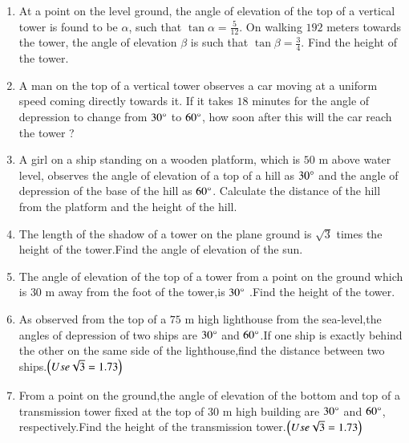 \begin{enumerate}[label=\thesubsection.\arabic*.,ref=\thesubsection.\theenumi]
    \hfill{}\item At a point on the level ground, the angle of elevation of the top of a vertical tower is found to be $\alpha$, such that $\tan\alpha = \frac{5}{12}$. On walking $192$ meters towards the tower, the angle of elevation $\beta$ is such that $\tan\beta = \frac{3}{4}$. Find the height of the tower.
    
    \hfill{}
\item A man on the top of a vertical tower observes a car moving at a uniform speed coming directly towards it. If it takes $18$ minutes for the angle of depression to change from $30\degree$ to $60\degree$, how soon after this will the car reach the tower ?

		\hfill{}\item A girl on a ship standing on a wooden platform, which is $50$ m above water level, observes the angle of elevation of a top of a hill as $30\degree$ and the angle of depression of the base of the hill as $60\degree$. Calculate the distance of the hill from the platform and the height of the hill.
\hfill{}

\item The length of the shadow of a tower on the plane ground is $\sqrt{3}$ times the height of the tower.Find the angle of elevation of the sun.

\hfill{}\item  The angle of elevation of the top of a tower from a point on the ground which is $30$ m away from the foot of the tower,is $30\degree$ .Find the height of the tower.

\hfill{}\item  As observed from the top of a $75$ m high lighthouse from the sea-level,the angles of depression of two ships are $30\degree$ and $60\degree$.If one ship is exactly behind the other on the same side of the lighthouse,find the distance between two ships.$\left(Use \sqrt{3} = 1.73\right)$

\hfill{}\item  From a point on the ground,the angle of elevation of the bottom and top of a transmission tower fixed at the top of $30$ m high building are $30\degree$ and $60\degree$, respectively.Find the height of the transmission tower.$\left(Use \sqrt{3} = 1.73\right)$
 \hfill{}   


\end{enumerate}
